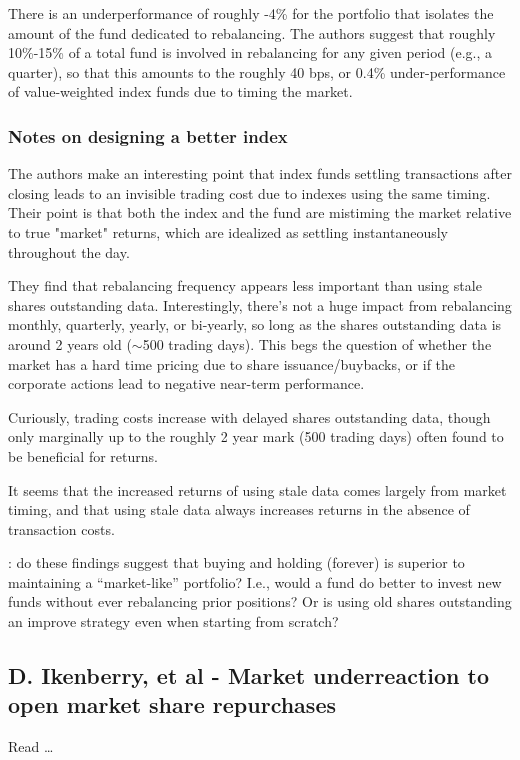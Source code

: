 There is an underperformance of roughly -4\% for the portfolio that isolates the amount of the fund dedicated to rebalancing.  The authors suggest that roughly 10\%-15\% of a total fund is involved in rebalancing for any given period (e.g., a quarter), so that this amounts to the roughly 40 bps, or 0.4\% under-performance of value-weighted index funds due to timing the market.

\subsubsection{Notes on designing a better index}

The authors make an interesting point that index funds settling transactions after closing leads to an invisible trading cost due to indexes using the same timing.  Their point is that both the index and the fund are mistiming the market relative to true "market" returns, which are idealized as settling instantaneously throughout the day.

They find that rebalancing frequency appears less important than using stale shares outstanding data.  Interestingly, there's not a huge impact from rebalancing monthly, quarterly, yearly, or bi-yearly, so long as the shares outstanding data is around 2 years old ($\sim$500 trading days).  This begs the question of whether the market has a hard time pricing due to share issuance/buybacks, or if the corporate actions lead to negative near-term performance.

Curiously, trading costs increase with delayed shares outstanding data, though only marginally up to the roughly 2 year mark (500 trading days) often found to be beneficial for returns.

It seems that the increased returns of using stale data comes largely from market timing, and that using stale data always increases returns in the absence of transaction costs.

\note{[Note]}: do these findings suggest that buying and holding (forever) is superior to maintaining a ``market-like'' portfolio?  I.e., would a fund do better to invest new funds without ever rebalancing prior positions?  Or is using old shares outstanding an improve strategy even when starting from scratch?

\subsection{D. Ikenberry, et al - Market underreaction to open market share repurchases}

Read \cite{Ikenberry1995}\ldots